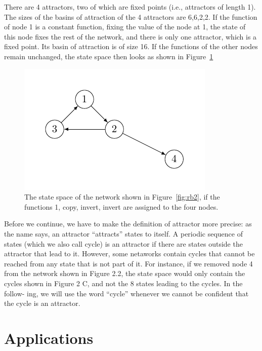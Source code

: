 There are 4 attractors, two of which are fixed points
(i.e., attractors of length 1). The sizes of the basins of
attraction of the 4 attractors are 6,6,2,2. If the function
of node 1 is a constant function, fixing the value of the
node at 1, the state of this node fixes the rest of the
network, and there is only one attractor, which is a fixed
point. Its basin of attraction is of size 16. If the functions
of the other nodes remain unchanged, the state space
then looks as shown in Figure~\ref{fig:rb4}

\begin{figure}[h]
\centering
\includegraphics[scale=1]{figurenetworks2.pdf}
\caption{The state space of the network shown in Figure~\ref{fig:rb2},
if the functions 1, copy, invert, invert are assigned to the four
nodes.}
\label{fig:rb4}
\end{figure}

Before we continue, we have to make the definition of
attractor more precise: as the name says, an attractor
“attracts” states to itself. A periodic sequence of states
(which we also call cycle) is an attractor if there are states
outside the attractor that lead to it. However, some netaworks contain cycles that cannot be reached from any
state that is not part of it. For instance, if we removed
node 4 from the network shown in Figure 2.2, the state
space would only contain the cycles shown in Figure 2 C,
and not the 8 states leading to the cycles. In the follow-
ing, we will use the word “cycle” whenever we cannot be
confident that the cycle is an attractor.


\section{Applications}

